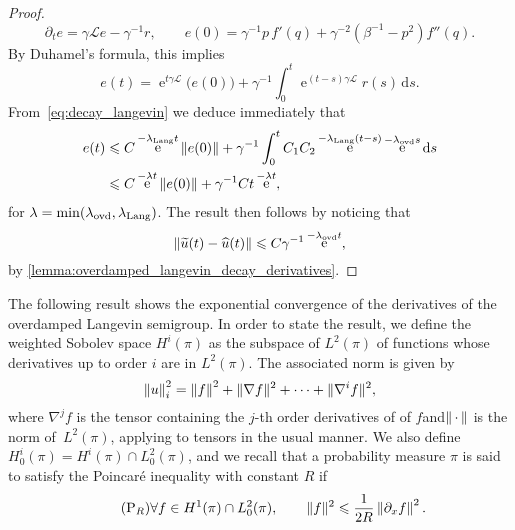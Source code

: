 \documentclass[11pt,a4paper]{article}
\DeclareMathOperator{\e}{e}
\newcommand{\dummy}{\,\cdot\,}
\renewcommand{\d}{\mathrm d}
\theoremstyle{plain}
\numberwithin{equation}{section}
\renewcommand{\leq}{\leqslant}
\begin{document}
\begin{proof}
    \[
        \partial_t e = \gamma \mathcal L e - \gamma^{-1} r, \qquad
        e(0) = \gamma^{-1} p \, f'(q) + \gamma^{-2} (\beta^{-1} - p^2) f''(q).
    \]
    By Duhamel's formula,
    this implies
    \[
        e(t) = \e^{t \gamma \mathcal L} \bigl( e(0) \bigr) + \gamma^{-1} \int_{0}^{t} \e^{(t- s) \gamma \mathcal L} r(s) \, \d s.
    \]
    From~\eqref{eq:decay_langevin} we deduce immediately that
    \begin{align*}
        e(t)
        &\leq C \e^{- \lambda_{\rm Lang} t} \norm{e(0)}
        + \gamma^{-1} \int_{0}^{t} C_1 C_2 \e^{- \lambda_{\rm Lang} (t-s)} \e^{-\lambda_{\rm ovd} s} \d s \\
        &\leq C \e^{- \lambda t} \norm{e(0)} + \gamma^{-1} C t \e^{- \lambda t},
    \end{align*}
    for $\lambda = \min(\lambda_{\rm ovd}, \lambda_{\rm Lang})$.
    The result then follows by noticing that
    \[
        \norm{\widetilde u(t) - \widehat u(t)} \leq C \gamma^{-1} \e^{- \lambda_{\rm ovd} t},
    \]
    by \cref{lemma:overdamped_langevin_decay_derivatives}.
\end{proof}

The following result shows the exponential convergence of the derivatives of the overdamped Langevin semigroup.
In order to state the result, we define the weighted Sobolev space $H^i(\pi)$ as the subspace of $L^2(\pi)$
of functions whose derivatives up to order $i$ are in $L^2(\pi)$.
The associated norm is given by
\[
    \norm{u}_i^2 = \norm{f}^2 + \norm*{\nabla f}^2 + \dotsb + \norm*{\nabla^i f}^2,
\]
where  $\nabla^j f$ is the tensor containing the $j$-th order derivatives of of $f$and$\norm{\dummy}$ is the norm of~$L^2(\pi)$,
applying to tensors in the usual manner.
We also define $H^{i}_0(\pi) = H^i(\pi) \cap L^2_0(\pi)$,
and we recall that a probability measure $\pi$ is said to satisfy the Poincaré inequality with constant $R$ if
\begin{equation}
    \label{eq:poincare}
    \tag{P$_R$}
    \forall f \in H^1(\pi) \cap L^2_0(\pi), \qquad
    \norm*{f}^2 \leq \frac{1}{2R} \norm{\partial_x f}^2.
\end{equation}
\end{document}
